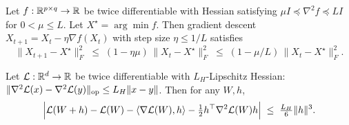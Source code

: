 
\begin{lemma}\label{lem:contract}
Let $f:\mathbb{R}^{p\times q}\to\mathbb{R}$ be twice differentiable with Hessian satisfying $\mu I\preceq\nabla^2 f\preceq L I$ for $0<\mu\le L$. Let $X^\star=\arg\min f$. Then gradient descent $X_{t+1}=X_t-\eta\nabla f(X_t)$ with step size $\eta\le 1/L$ satisfies
\begin{equation}
\|X_{t+1}-X^\star\|_F^2 \;\le\; (1-\eta\mu)\,\|X_t-X^\star\|_F^2 \;\le\; (1-\mu/L)\,\|X_t-X^\star\|_F^2.
\end{equation}
\end{lemma}


\begin{lemma}\label{lem:taylor}
Let $\mathcal{L}:\mathbb{R}^d\to\mathbb{R}$ be twice differentiable with $L_H$-Lipschitz Hessian: $\|\nabla^2\mathcal{L}(x)-\nabla^2\mathcal{L}(y)\|_\text{op}\le L_H\|x-y\|$. Then for any $W,h$,
\begin{equation}
\Bigl|\mathcal{L}(W+h)-\mathcal{L}(W)-\langle\nabla\mathcal{L}(W),h\rangle-\tfrac12 h^\top\nabla^2\mathcal{L}(W)h\Bigr| \;\le\; \tfrac{L_H}{6}\|h\|^3.
\end{equation}
\end{lemma}










